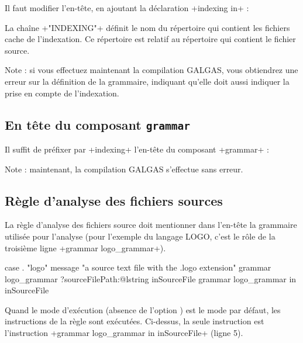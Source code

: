 Il faut modifier l'en-tête, en ajoutant la déclaration  \ggs+indexing in+ :


\begin{galgas}
lexique logo_lexique indexing in "INDEXING" {
  ...
\end{galgas}

La chaîne \ggs+"INDEXING"+ définit le nom du répertoire qui contient les fichiers cache de l'indexation. Ce répertoire est relatif au répertoire qui contient le fichier source.

Note : si vous effectuez maintenant la compilation GALGAS, vous obtiendrez une erreur sur la définition de la grammaire, indiquant qu'elle doit aussi indiquer la prise en compte de l'indexation.




\subsection{En tête du composant \texttt{grammar}}

Il suffit de préfixer par \ggs+indexing+ l'en-tête du composant \ggs+grammar+ :

\begin{galgas}
indexing grammar logo_grammar ... {
  ...
\end{galgas}

Note : maintenant, la compilation GALGAS s'effectue sans erreur.




\subsection{Règle d'analyse des fichiers sources}

La règle d'analyse des fichiers source doit mentionner dans l'en-tête la grammaire utilisée pour l'analyse (pour l'exemple du langage LOGO, c'est le rôle de la troisième ligne \ggs+grammar logo_grammar+).

\begin{galgas}
case . "logo"
message "a source text file with the .logo extension"
grammar logo_grammar
?sourceFilePath:@lstring inSourceFile {
  grammar logo_grammar in inSourceFile
}
\end{galgas}

Quand le mode d'exécution (absence de l'option ) est le mode par défaut, les instructions de la règle sont exécutées. Ci-dessus, la seule instruction est l'instruction \ggs+grammar logo_grammar in inSourceFile+ (ligne 5).

